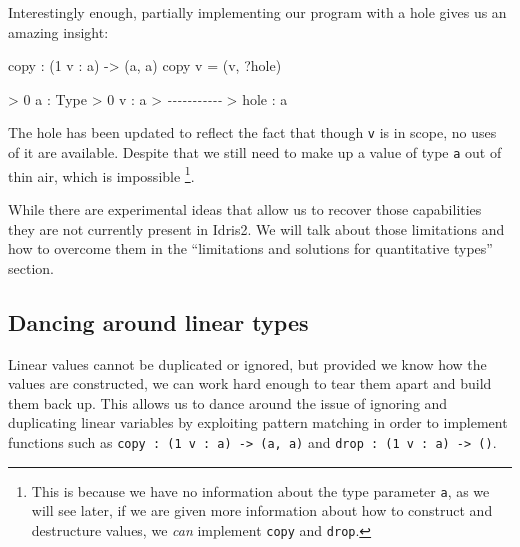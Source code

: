 \documentclass[
]{article}
\newenvironment{Shaded}{}{}
\newcommand{\CommentTok}[1]{\textcolor[rgb]{0.38,0.63,0.69}{\textit{#1}}}
\newcommand{\DataTypeTok}[1]{\textcolor[rgb]{0.56,0.13,0.00}{#1}}
\newcommand{\DecValTok}[1]{\textcolor[rgb]{0.25,0.63,0.44}{#1}}
\newcommand{\NormalTok}[1]{#1}
\newcommand{\OperatorTok}[1]{\textcolor[rgb]{0.40,0.40,0.40}{#1}}
\newcommand{\OtherTok}[1]{\textcolor[rgb]{0.00,0.44,0.13}{#1}}
\begin{document}
Interestingly enough, partially implementing our program with a hole
gives us an amazing insight:

\begin{Shaded}
\begin{Highlighting}[]
\NormalTok{copy }\OperatorTok{:}\NormalTok{ (}\DecValTok{1}\NormalTok{ v }\OperatorTok{:}\NormalTok{ a) }\OtherTok{{-}\textgreater{}}\NormalTok{ (a, a)}
\NormalTok{copy v }\OtherTok{=}\NormalTok{ (v, }\OperatorTok{?}\NormalTok{hole)}
\end{Highlighting}
\end{Shaded}

\begin{Shaded}
\begin{Highlighting}[]
\OperatorTok{\textgreater{}} \DecValTok{0}\NormalTok{ a }\OperatorTok{:} \DataTypeTok{Type}
\OperatorTok{\textgreater{}} \DecValTok{0}\NormalTok{ v }\OperatorTok{:}\NormalTok{ a}
\OperatorTok{\textgreater{}} \CommentTok{{-}{-}{-}{-}{-}{-}{-}{-}{-}{-}{-}}
\OperatorTok{\textgreater{}}\NormalTok{ hole }\OperatorTok{:}\NormalTok{ a}
\end{Highlighting}
\end{Shaded}

The hole has been updated to reflect the fact that though \texttt{v} is
in scope, no uses of it are available. Despite that we still need to
make up a value of type \texttt{a} out of thin air, which is impossible
\footnote{This is because we have no information about the type
  parameter \texttt{a}, as we will see later, if we are given more
  information about how to construct and destructure values, we
  \emph{can} implement \texttt{copy} and \texttt{drop}.}.

While there are experimental ideas that allow us to recover those
capabilities they are not currently present in Idris2. We will talk
about those limitations and how to overcome them in the ``limitations
and solutions for quantitative types'' section.

\hypertarget{dancing-around-linear-types}{%
\subsection{Dancing around linear
types}\label{dancing-around-linear-types}}

Linear values cannot be duplicated or ignored, but provided we know how
the values are constructed, we can work hard enough to tear them apart
and build them back up. This allows us to dance around the issue of
ignoring and duplicating linear variables by exploiting pattern matching
in order to implement functions such as
\texttt{copy\ :\ (1\ v\ :\ a)\ \textasciigrave{}-\textgreater{}\ (a,\ a)}
and \texttt{drop\ :\ (1\ v\ :\ a)\ -\textgreater{}\ ()}.
\end{document}
